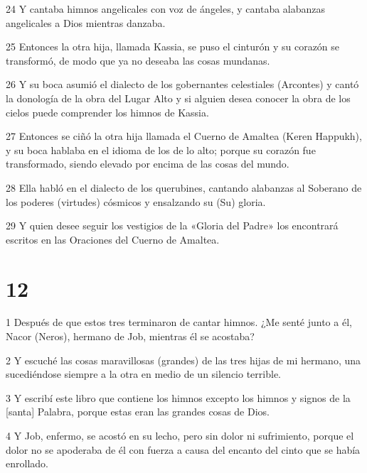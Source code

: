 \par 24 Y cantaba himnos angelicales con voz de ángeles, y cantaba alabanzas angelicales a Dios mientras danzaba.

\par 25 Entonces la otra hija, llamada Kassia, se puso el cinturón y su corazón se transformó, de modo que ya no deseaba las cosas mundanas.

\par 26 Y su boca asumió el dialecto de los gobernantes celestiales (Arcontes) y cantó la donología de la obra del Lugar Alto y si alguien desea conocer la obra de los cielos puede comprender los himnos de Kassia.

\par 27 Entonces se ciñó la otra hija llamada el Cuerno de Amaltea (Keren Happukh), y su boca hablaba en el idioma de los de lo alto; porque su corazón fue transformado, siendo elevado por encima de las cosas del mundo.

\par 28 Ella habló en el dialecto de los querubines, cantando alabanzas al Soberano de los poderes (virtudes) cósmicos y ensalzando su (Su) gloria.

\par 29 Y quien desee seguir los vestigios de la «Gloria del Padre» los encontrará escritos en las Oraciones del Cuerno de Amaltea.

\chapter{12}

\par 1 Después de que estos tres terminaron de cantar himnos. ¿Me senté junto a él, Nacor (Neros), hermano de Job, mientras él se acostaba?

\par 2 Y escuché las cosas maravillosas (grandes) de las tres hijas de mi hermano, una sucediéndose siempre a la otra en medio de un silencio terrible.

\par 3 Y escribí este libro que contiene los himnos excepto los himnos y signos de la [santa] Palabra, porque estas eran las grandes cosas de Dios.

\par 4 Y Job, enfermo, se acostó en su lecho, pero sin dolor ni sufrimiento, porque el dolor no se apoderaba de él con fuerza a causa del encanto del cinto que se había enrollado.

